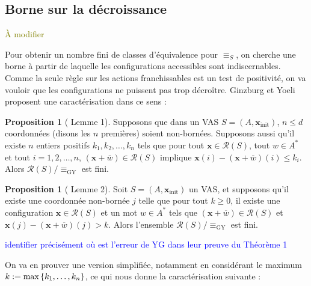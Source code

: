 \documentclass[a4paper,final]{article}
\theoremstyle{definition}
\newtheorem{Proposition}[Theorem]{Proposition}
\let\leq\leqslant
\let\geq\geqslant
\newcommand{\alain}[1]{\textcolor{blue}{#1}}
\newcommand{\lucas}[1]{\textcolor{olive}{#1}}
\newcommand{\os}[1]{\left\{\mathinner{#1}\right\}}
\newcommand{\N}{\ensuremath{\mathbb{N}}}
\newcommand{\lang}{\ensuremath{\mathcal{L}}}
\newcommand{\conf}{\ensuremath{\mathcal{R}}}
\newcommand{\vect}[1]{\ensuremath{\mathbf{#1}}}
\newcommand{\rel}{\ensuremath{\equiv}}
\newcommand{\relGY}{\ensuremath{\equiv_\text{GY}}}
\newcommand{\xinit}{\ensuremath{\vect{x}_\text{init}}}
\newcommand{\valeur}[1]{\ensuremath{\overline{#1}}}
\begin{document}
\color{black} %


\subsection{Borne sur la décroissance}
\lucas{À modifier}

Pour obtenir un nombre fini de classes d'équivalence pour $\rel_S$, on cherche une borne à partir de laquelle les configurations accessibles sont indiscernables.
Comme la seule règle sur les actions franchissables est un test de positivité, on va vouloir que les configurations ne puissent pas trop décroître.
Ginzburg et Yoeli proposent une caractérisation dans ce sens :


\begin{Proposition}[\cite{giyo80} Lemme 1]
    Supposons que dans un VAS $S=(A,\xinit)$, $n\leq d$ coordonnées (disons les $n$ premières) soient non-bornées.
    Supposons aussi qu'il existe $n$ entiers positifs $k_1,k_2,\dots,k_n$ tels que pour tout $\vect{x}\in\conf(S)$, tout $w\in A^\ast$ et tout $i=1,2,\dots,n$, 
    $(\vect{x} +\valeur{w})\in\conf(S)$ implique
    $\vect{x}(i) - (\vect{x} +\valeur{w})(i) \leq k_i$.
    Alors $\conf(S)/\relGY$ est fini.
\end{Proposition}

\begin{Proposition}[\cite{giyo80} Lemme 2]
    Soit $S=(A,\xinit)$ un VAS, et supposons qu'il existe une coordonnée non-bornée $j$ telle que 
    pour tout $k\geq 0$, il existe une configuration $\vect{x}\in\conf(S)$ et un mot $w\in A^\ast$ tels que 
    $(\vect{x} +\valeur{w}) \in\conf(S)$ et $\vect{x}(j) - (\vect{x} +\valeur{w})(j) > k$.
    Alors l'ensemble $\conf(S)/\relGY$ est fini.
\end{Proposition}

\alain{identifier précisément où est l'erreur de YG dans leur preuve du Théorème 1}

On va en prouver une version simplifiée, notamment en considérant le maximum $k:= \text{max}\os{k_1,\dots,k_n}$, ce qui nous donne la caractérisation suivante :


\end{document}
